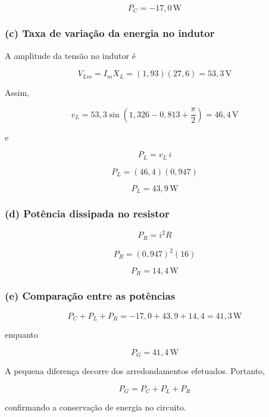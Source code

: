 \[
\boxed{P_C=-17,0\,\text{W}}
\]

\subsubsection*{(c) Taxa de variação da energia no indutor}

A amplitude da tensão no indutor é

\[
V_{Lm}
=
I_mX_L
=
(1,93)(27,6)
=
53,3\,\text{V}
\]

Assim,

\[
v_L
=
53,3
\sin\!\left(
1,326-0,813+\frac{\pi}{2}
\right)
=
46,4\,\text{V}
\]

e

\[
P_L=v_L\,i
\]

\[
P_L
=
(46,4)(0,947)
\]

\[
\boxed{P_L=43,9\,\text{W}}
\]

\subsubsection*{(d) Potência dissipada no resistor}

\[
P_R=i^2R
\]

\[
P_R=(0,947)^2(16)
\]

\[
\boxed{P_R=14,4\,\text{W}}
\]

\subsubsection*{(e) Comparação entre as potências}

\[
P_C+P_L+P_R
=
-17,0+43,9+14,4
=
41,3\,\text{W}
\]

enquanto

\[
P_G=41,4\,\text{W}
\]

A pequena diferença decorre dos arredondamentos efetuados. Portanto,

\[
\boxed{
P_G=P_C+P_L+P_R
}
\]

confirmando a conservação de energia no circuito.

\vspace{1cm}
